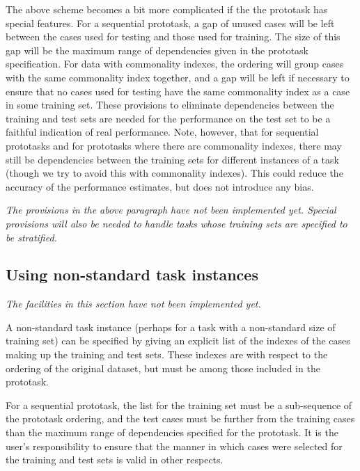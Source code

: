 The above scheme becomes a bit more complicated if the the prototask
has special features.  For a sequential prototask, a gap of unused
cases will be left between the cases used for testing and those used
for training.  The size of this gap will be the maximum range of
dependencies given in the prototask specification.  For data with
commonality indexes, the ordering will group cases with the same
commonality index together, and a gap will be left if necessary to
ensure that no cases used for testing have the same commonality index
as a case in some training set.  These provisions to eliminate
dependencies between the training and test sets are needed for the
performance on the test set to be a faithful indication of real
performance.  Note, however, that for sequential prototasks and for
prototasks where there are commonality indexes, there may still be
dependencies between the training sets for different instances of a
task (though we try to avoid this with commonality indexes).  This
could reduce the accuracy of the performance estimates, but does not
introduce any bias.

\emph{The provisions in the above paragraph have not been implemented
yet. Special provisions will also be needed to handle tasks whose
training sets are specified to be stratified.}


\subsection{Using non-standard task instances}\label{scheme-non-standard}

\emph{The facilities in this section have not been implemented yet.}

A non-standard task instance (perhaps for a task with a non-standard
size of training set) can be specified by giving an explicit list of
the indexes of the cases making up the training and test sets.  These
indexes are with respect to the ordering of the original dataset, but
must be among those included in the prototask.

For a sequential prototask, the list for the training set must be a
sub-sequence of the prototask ordering, and the test cases must be
further from the training cases than the maximum range of dependencies
specified for the prototask.  It is the user's responsibility to
ensure that the manner in which cases were selected for the training
and test sets is valid in other respects.
